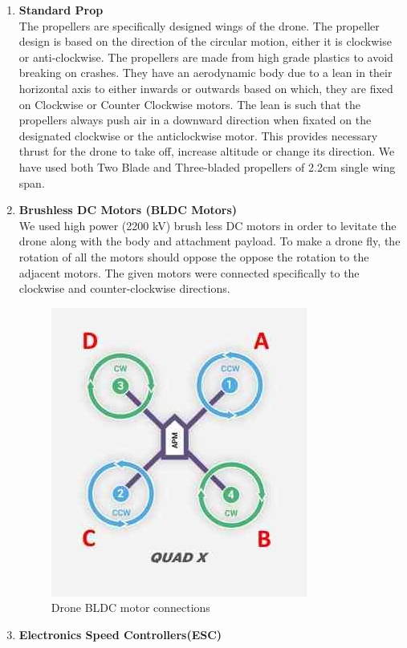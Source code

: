 \begin{enumerate}
    \item \textbf{Standard Prop}\\
    The propellers are specifically designed wings of the drone. The propeller design is based on the direction of the circular motion, either it is clockwise or anti-clockwise. The propellers are made from high grade plastics to avoid breaking on crashes. They have an aerodynamic body due to a lean in their horizontal axis to either inwards or outwards based on which, they are fixed on Clockwise or Counter Clockwise motors. The lean is such that the propellers always push air in a downward direction when fixated on the designated clockwise or the anticlockwise motor. This provides necessary thrust for the drone to take off, increase altitude or change its direction. We have used both Two Blade and Three-bladed propellers of 2.2cm single wing span.
    \item \textbf{Brushless DC Motors (BLDC Motors)}\\
    We used high power (2200 kV) brush less DC motors in order to levitate the drone along with the body and attachment payload. To make a drone fly, the rotation of all the motors should oppose the oppose the rotation to the adjacent motors. The given motors were connected specifically to the clockwise and counter-clockwise directions.
    \begin{figure}[H]
    \centering
    \includegraphics[]{SummerInterReport/project/Images-Major/motors.png}
    \caption{Drone BLDC motor connections}
    \label{fig:motors}
\end{figure}
    \item \textbf{Electronics Speed Controllers(ESC)}\\

\end{enumerate}
